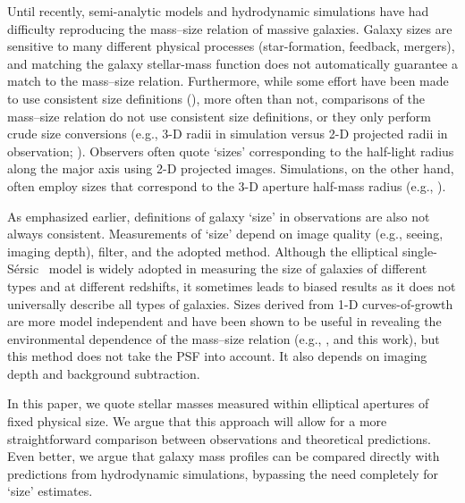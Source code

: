 \documentclass[a4paper,fleqn,usenatbib]{mnras}
\def\ser{{S\'{e}rsic\ }}
\begin{document}
    Until recently, semi-analytic models and hydrodynamic simulations have had
    difficulty reproducing the mass--size relation of massive galaxies. 
    Galaxy sizes are sensitive to many different physical processes (star-formation, 
    feedback, mergers), and matching the galaxy stellar-mass function does not 
    automatically guarantee a match to the mass--size relation. 
    Furthermore, while some effort have been made to use consistent size definitions 
    (\citealt{McCarthy2017}), more often than not, comparisons of the mass--size relation 
    do not use consistent size definitions, or they only perform crude size conversions 
    (e.g., 3-D radii in simulation versus 2-D projected radii in observation; 
    \citealt{Genel2017}). 
    Observers often quote `sizes' corresponding to the half-light radius along the 
    major axis using 2-D projected images. 
    Simulations, on the other hand, often employ sizes that correspond to the 3-D 
    aperture half-mass radius (e.g., \citealt{Price2017}). 
    
    As emphasized earlier, definitions of galaxy `size' in observations are also not 
    always consistent. 
    Measurements of `size' depend on image quality (e.g., seeing, imaging depth), filter, 
    and the adopted method. 
    Although the elliptical single-\ser{} model is widely adopted in measuring the 
    size of galaxies of different types and at different redshifts, it sometimes leads
    to biased results as it does not universally describe all types of galaxies. Sizes derived from 1-D curves-of-growth are more model independent and have been 
    shown to be useful in revealing the environmental dependence of the mass--size relation 
    (e.g., \citealt{Yoon2017}, and this work), but this method does not take the PSF into account. It also depends on imaging depth and background subtraction.

    In this paper, we quote stellar masses measured within elliptical apertures of 
    fixed physical size. 
    We argue that this approach will allow for a more straightforward comparison 
    between observations and theoretical predictions. Even better, we argue that galaxy mass profiles can be compared directly with predictions from hydrodynamic simulations, bypassing the need completely for `size' estimates.
          

\end{document}
